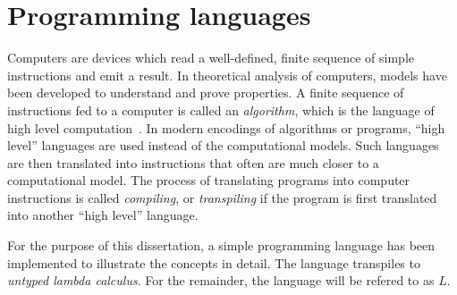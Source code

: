 \documentclass[11pt,oneside,a4paper]{report}
\begin{document}
\chapter{Programming languages}
Computers are devices which read a well-defined, finite sequence of simple instructions and emit a result.
In theoretical analysis of computers, models have been developed to understand and prove properties.
A finite sequence of instructions fed to a computer is called an \textit{algorithm}, which is the language of high level computation~\cite{copeland1997church}.
In modern encodings of algorithms or programs, ``high level'' languages are used instead of the computational models.
Such languages are then translated into instructions that often are much closer to a computational model.
The process of translating programs into computer instructions is called \textit{compiling}, or \textit{transpiling} if the program is first translated into another ``high level'' language.

For the purpose of this dissertation, a simple programming language has been implemented to illustrate the concepts in detail.
The language transpiles to \textit{untyped lambda calculus}.
For the remainder, the language will be refered to as $L$.




\end{document}

